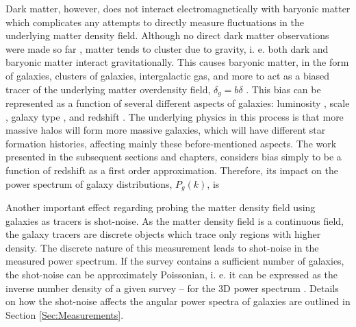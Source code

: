 \qquad Dark matter, however, does not interact electromagnetically with baryonic matter which complicates any attempts to directly measure fluctuations in the underlying matter density field. Although no direct dark matter observations were made so far \citep{2017DarkMatterExpReview}, matter tends to cluster due to gravity, i. e. both dark and baryonic matter interact gravitationally. This causes baryonic matter, in the form of galaxies, clusters of galaxies, intergalactic gas, and more to act as a biased tracer of the underlying matter overdensity field, $\delta_g = b\delta$ \citep{2000-BensonBias,1999Ofer-Bias}. This bias can be represented as a function of several different aspects of galaxies: luminosity \citep{2000-BensonBias,2004PVP,2013Baugh-LumBias}, scale \citep{1999Ofer-Bias,2008ScaleBias,2008Hamann-ScaleBias,2018Simon-ScaleBias}, galaxy type \citep{2008Sanchez-Bias,2016AbramoSeccoLoureiro}, and redshift \citep{1994FKP,1998Heavens-Verde,2000-BensonBias}. The underlying physics in this process is that more massive halos will form more massive galaxies, which will have different star formation histories, affecting mainly these before-mentioned aspects. The work presented in the subsequent sections and chapters, considers bias simply to be a function of redshift as a first order approximation. Therefore, its impact on the power spectrum of galaxy distributions, $P_g(k)$, is 


\qquad Another important effect regarding probing the matter density field using galaxies as tracers is shot-noise. As the matter density field is a continuous field, the galaxy tracers are discrete objects which trace only regions with higher density. The discrete nature of this measurement leads to shot-noise in the measured power spectrum. If the survey contains a sufficient number of galaxies, the shot-noise can be approximately Poissonian, i. e. it can be expressed as the inverse number density of a given survey -- for the 3D power spectrum  \citep{1994FKP,2009Seljak-ShotNoise,2017Paech}. Details on how the shot-noise affects the angular power spectra of galaxies are outlined in Section \ref{Sec:Measurements}.

